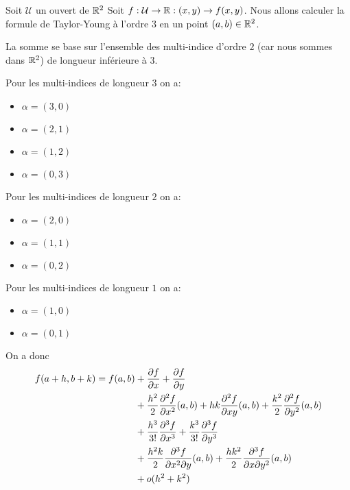 \begin{exemple}
	Soit $\mathcal{U}$ un ouvert de $\mathbb{R}^{2}$
	Soit $f : \mathcal{U} \rightarrow \mathbb{R} : (x, y) \rightarrow f(x, y)$.
	Nous allons calculer la formule de Taylor-Young à l'ordre $3$ en un point
	$(a, b) \in \mathbb{R}^{2}$.

	La somme se base sur l'ensemble des multi-indice d'ordre $2$ (car nous
	sommes dans $\mathbb{R}^{2}$) de longueur inférieure à $3$.

	Pour les multi-indices de longueur $3$ on a:
	\begin{itemize}
		\item $\alpha = (3, 0)$
		\item $\alpha = (2, 1)$
		\item $\alpha = (1, 2)$
		\item $\alpha = (0, 3)$
	\end{itemize}

	Pour les multi-indices de longueur $2$ on a:
	\begin{itemize}
		\item $\alpha = (2, 0)$
		\item $\alpha = (1, 1)$
		\item $\alpha = (0, 2)$
	\end{itemize}

	Pour les multi-indices de longueur $1$ on a:
	\begin{itemize}
		\item $\alpha = (1, 0)$
		\item $\alpha = (0, 1)$
	\end{itemize}

	On a donc
	\begin{align*}
		f(a + h, b + k) = f(a, b)
		& + \pdv{f}{x} (a, b) + \pdv{f}{y} (a, b) \\
		& + \frac{h^{2}}{2} \frac{\partial^{2}{f}}{\partial x^{2}} (a, b) + hk
		\frac{\partial^{2}{f}}{\partial xy} (a, b) + \frac{k^{2}}{2}
		\frac{\partial^{2}{f}}{\partial y^{2}} (a, b) \\
		& + \frac{h^{3}}{3!} \pdv[3]{f}{x} (a, b) + \frac{k^{3}}{3!} \pdv[3]{f}{y} (a, b) \\
		& + \frac{h^{2} k}{2} \frac{\partial^{3} f}{\partial x^{2} \partial y} (a, b) +
		\frac{h k^{2}}{2} \frac{\partial^{3}{f}}{\partial x \partial y^{2}} (a, b) \\
		& + o(h^{2} + k^{2})
	\end{align*}
\end{exemple}
